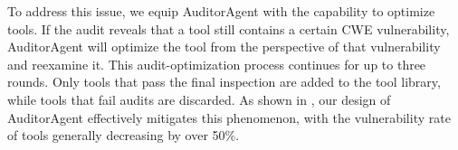 To address this issue, we equip AuditorAgent with the capability to optimize tools. If the audit reveals that a tool still contains a certain CWE vulnerability, AuditorAgent will optimize the tool from the perspective of that vulnerability and reexamine it. This audit-optimization process continues for up to three rounds. Only tools that pass the final inspection are added to the tool library, while tools that fail audits are discarded. As shown in , our design of AuditorAgent effectively mitigates this phenomenon, with the vulnerability rate of tools generally decreasing by over 50\%.
